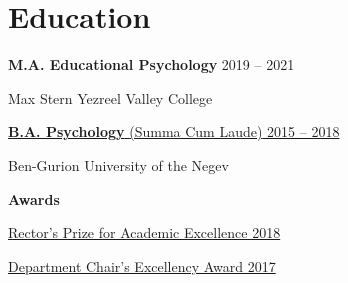 \documentclass[
	12pt,a4paper %
]{article}
\begin{document}

\section{Education}

\textbf{\large M.A. Educational Psychology} \hfill 2019 -- 2021

\noindent Max Stern Yezreel Valley College

\noindent\dotfill %

\noindent\href{https://loona-il.000webhostapp.com/resume-references/BA-and-honorary.pdf}{\large \noindent\textbf{B.A. Psychology} \normalsize{(Summa Cum Laude)} \hfill 2015 -- 2018}

\noindent Ben-Gurion University of the Negev

\noindent\textbf{Awards}

\href{https://loona-il.000webhostapp.com/resume-references/BA-and-honorary.pdf}{Rector’s Prize for Academic Excellence \hfill 2018}

\href{https://loona-il.000webhostapp.com/resume-references/BA-and-honorary.pdf}{Department Chair’s Excellency Award \hfill 2017}
\end{document}
